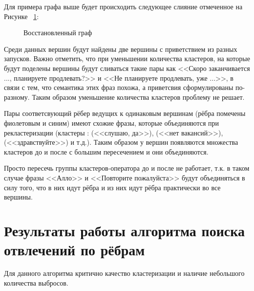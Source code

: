 \documentclass[times,specification,annotation]{itmo-student-thesis}
\begin{document}
	Для примера графа выше будет происходить следующее слияние отмеченное на Рисунке ~\ref{fig:adapt:graph:merge}:
	
	\begin{figure}[H]
		\caption{Восстановленный граф}
		\label{fig:adapt:graph:merge}
	\end{figure}

	Среди данных вершин будут найдены две вершины с приветствием из разных запусков. Важно отметить, что при уменьшении количества кластеров, на которые будут поделены вершины будут сливаться такие пары как <<Скоро заканчивается ..., планируете продлевать?>> и <<Не планируете продлевать, уже ...>>, в связи с тем, что семантика этих фраз похожа, а приветсвия сформулированы по-разному. Таким образом уменьшение количества кластеров проблему не решает.
	
	Пары соответсвующий рёбер ведущих к одинаковым вершинам (рёбра помечены фиолетовым и синим) имеют схожие фразы, которые объединяются при рекластеризации (кластеры : (<<слушаю, да>>), (<<нет вакансий>>), (<<здравствуйте>>) и т.д.). Таким образом у вершин появляются множества кластеров до и после с большим пересечением и они объединяются.
	
	Просто пересечь группы кластеров-оператора до и после не работает, т.к. в таком случае фразы <<Алло>> и <<Повторите пожалуйста>> будут объединяться в силу того, что в них идут рёбра и из них идут рёбра практически во все вершины.
	
	\section{Результаты работы алгоритма поиска отвлечений по рёбрам}
	Для данного алгоритма критично качество кластеризации и наличие небольшого количества выбросов. 
		
\end{document}
